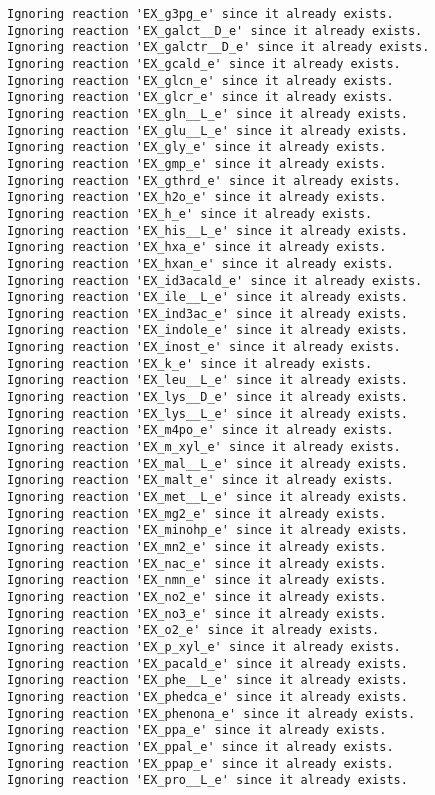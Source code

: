 \documentclass[
  letterpaper,
  DIV=11,
  numbers=noendperiod]{scrartcl}
\begin{document}
\begin{verbatim}
Ignoring reaction 'EX_g3pg_e' since it already exists.
Ignoring reaction 'EX_galct__D_e' since it already exists.
Ignoring reaction 'EX_galctr__D_e' since it already exists.
Ignoring reaction 'EX_gcald_e' since it already exists.
Ignoring reaction 'EX_glcn_e' since it already exists.
Ignoring reaction 'EX_glcr_e' since it already exists.
Ignoring reaction 'EX_gln__L_e' since it already exists.
Ignoring reaction 'EX_glu__L_e' since it already exists.
Ignoring reaction 'EX_gly_e' since it already exists.
Ignoring reaction 'EX_gmp_e' since it already exists.
Ignoring reaction 'EX_gthrd_e' since it already exists.
Ignoring reaction 'EX_h2o_e' since it already exists.
Ignoring reaction 'EX_h_e' since it already exists.
Ignoring reaction 'EX_his__L_e' since it already exists.
Ignoring reaction 'EX_hxa_e' since it already exists.
Ignoring reaction 'EX_hxan_e' since it already exists.
Ignoring reaction 'EX_id3acald_e' since it already exists.
Ignoring reaction 'EX_ile__L_e' since it already exists.
Ignoring reaction 'EX_ind3ac_e' since it already exists.
Ignoring reaction 'EX_indole_e' since it already exists.
Ignoring reaction 'EX_inost_e' since it already exists.
Ignoring reaction 'EX_k_e' since it already exists.
Ignoring reaction 'EX_leu__L_e' since it already exists.
Ignoring reaction 'EX_lys__D_e' since it already exists.
Ignoring reaction 'EX_lys__L_e' since it already exists.
Ignoring reaction 'EX_m4po_e' since it already exists.
Ignoring reaction 'EX_m_xyl_e' since it already exists.
Ignoring reaction 'EX_mal__L_e' since it already exists.
Ignoring reaction 'EX_malt_e' since it already exists.
Ignoring reaction 'EX_met__L_e' since it already exists.
Ignoring reaction 'EX_mg2_e' since it already exists.
Ignoring reaction 'EX_minohp_e' since it already exists.
Ignoring reaction 'EX_mn2_e' since it already exists.
Ignoring reaction 'EX_nac_e' since it already exists.
Ignoring reaction 'EX_nmn_e' since it already exists.
Ignoring reaction 'EX_no2_e' since it already exists.
Ignoring reaction 'EX_no3_e' since it already exists.
Ignoring reaction 'EX_o2_e' since it already exists.
Ignoring reaction 'EX_p_xyl_e' since it already exists.
Ignoring reaction 'EX_pacald_e' since it already exists.
Ignoring reaction 'EX_phe__L_e' since it already exists.
Ignoring reaction 'EX_phedca_e' since it already exists.
Ignoring reaction 'EX_phenona_e' since it already exists.
Ignoring reaction 'EX_ppa_e' since it already exists.
Ignoring reaction 'EX_ppal_e' since it already exists.
Ignoring reaction 'EX_ppap_e' since it already exists.
Ignoring reaction 'EX_pro__L_e' since it already exists.

\end{verbatim}
\end{document}
